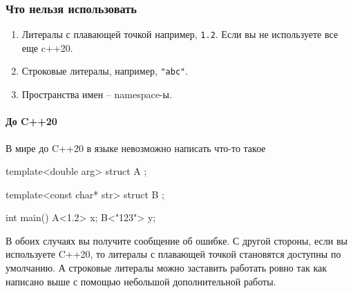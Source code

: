\subsubsection{Что нельзя использовать}

\begin{enumerate}
\item Литералы с плавающей точкой например, \verb"1.2".
Если вы не используете все еще c++20.

\item Строковые литералы, например, \verb$"abc"$.

\item Пространства имен -- namespace-ы.
\end{enumerate}

\paragraph{До C++20}

В мире до C++20 в языке невозможно написать что-то такое
\begin{cppcode}
template<double arg>
struct A {};

template<const char* str>
struct B {};

int main() {
  A<1.2> x;
  B<"123"> y;
}
\end{cppcode}
В обоих случаях вы получите сообщение об ошибке.
С другой стороны, если вы используете C++20, то литералы с плавающей точкой становятся доступны по умолчанию.
А строковые литералы можно заставить работать ровно так как написано выше с помощью небольшой дополнительной работы.

